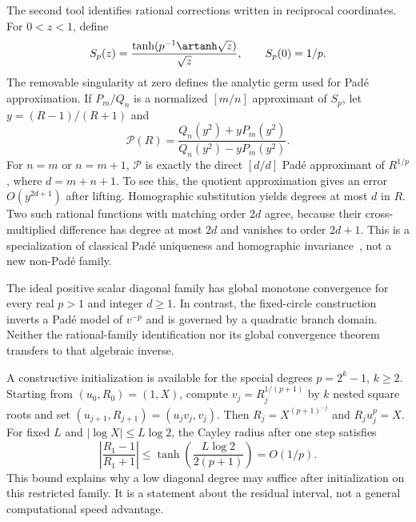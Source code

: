 The second tool identifies rational corrections written in reciprocal coordinates. For $0<z<1$, define
\[
 S_p(z)=\frac{\tanh(p^{-1}\artanh\sqrt z)}{\sqrt z},\qquad S_p(0)=1/p.
\]
The removable singularity at zero defines the analytic germ used for Pad\'e approximation. If $P_m/Q_n$ is a normalized $[m/n]$ approximant of $S_p$, let $y=(R-1)/(R+1)$ and
\[
 \mathcal P(R)=\frac{Q_n(y^2)+yP_m(y^2)}{Q_n(y^2)-yP_m(y^2)}.
\]
For $n=m$ or $n=m+1$, $\mathcal P$ is exactly the direct $[d/d]$ Pad\'e approximant of $R^{1/p}$, where $d=m+n+1$. To see this, the quotient approximation gives an error $O(y^{2d+1})$ after lifting. Homographic substitution yields degrees at most $d$ in $R$. Two such rational functions with matching order $2d$ agree, because their cross-multiplied difference has degree at most $2d$ and vanishes to order $2d+1$. This is a specialization of classical Pad\'e uniqueness and homographic invariance~\cite{baker1996}, not a new non-Pad\'e family.

The ideal positive scalar diagonal family has global monotone convergence for every real $p>1$ and integer $d\ge1$. In contrast, the fixed-circle construction inverts a Pad\'e model of $v^{-p}$ and is governed by a quadratic branch domain. Neither the rational-family identification nor its global convergence theorem transfers to that algebraic inverse.

A constructive initialization is available for the special degrees $p=2^k-1$, $k\ge2$. Starting from $(u_0,R_0)=(1,X)$, compute $v_j=R_j^{1/(p+1)}$ by $k$ nested square roots and set $(u_{j+1},R_{j+1})=(u_jv_j,v_j)$. Then $R_j=X^{(p+1)^{-j}}$ and $R_ju_j^p=X$. For fixed $L$ and $|\log X|\le L\log2$, the Cayley radius after one step satisfies
\[
 \left|\frac{R_1-1}{R_1+1}\right|\le\tanh\!\left(\frac{L\log2}{2(p+1)}\right)=O(1/p).
\]
This bound explains why a low diagonal degree may suffice after initialization on this restricted family. It is a statement about the residual interval, not a general computational speed advantage.

